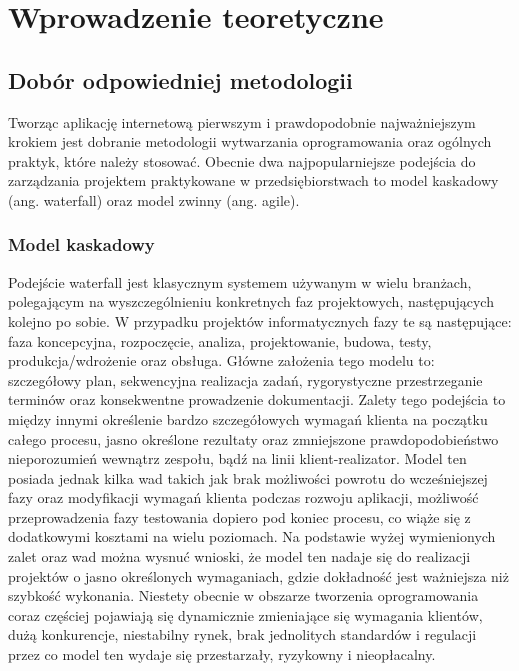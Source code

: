 \chapter{Wprowadzenie teoretyczne}
\label{cha:wprowadzenieTeoretyczne}

\section{Dobór odpowiedniej metodologii}
\label{sec:doborMetodologi}

Tworząc aplikację internetową pierwszym i prawdopodobnie najważniejszym krokiem
jest dobranie metodologii wytwarzania oprogramowania oraz ogólnych praktyk, które
należy stosować. Obecnie dwa najpopularniejsze podejścia do zarządzania projektem
praktykowane w przedsiębiorstwach to model kaskadowy (ang. waterfall) oraz model
zwinny (ang. agile).

\subsection{Model kaskadowy}
\label{subsec:modelKaskadowy}
Podejście waterfall jest klasycznym systemem używanym w wielu branżach,
polegającym na wyszczególnieniu konkretnych faz projektowych, następujących kolejno po sobie. W
przypadku projektów informatycznych fazy te są następujące: faza koncepcyjna, rozpoczęcie,
analiza, projektowanie, budowa, testy, produkcja/wdrożenie oraz obsługa. Główne
założenia tego modelu to: szczegółowy plan, sekwencyjna realizacja zadań, rygorystyczne
przestrzeganie terminów oraz konsekwentne prowadzenie dokumentacji. Zalety tego
podejścia to między innymi określenie bardzo szczegółowych wymagań klienta na początku
całego procesu, jasno określone rezultaty oraz zmniejszone prawdopodobieństwo
nieporozumień wewnątrz zespołu, bądź na linii klient-realizator. Model ten posiada jednak
kilka wad takich jak brak możliwości powrotu do wcześniejszej fazy oraz 
modyfikacji wymagań klienta podczas rozwoju aplikacji, możliwość przeprowadzenia
fazy testowania dopiero pod koniec procesu, co wiąże się z dodatkowymi kosztami na wielu
poziomach. Na podstawie wyżej wymienionych zalet oraz wad można wysnuć wnioski, że
model ten nadaje się do realizacji projektów o jasno określonych wymaganiach, gdzie
dokładność jest ważniejsza niż szybkość wykonania. Niestety obecnie w obszarze tworzenia
oprogramowania coraz częściej pojawiają się dynamicznie zmieniające się wymagania klientów, dużą konkurencje, niestabilny rynek, brak jednolitych standardów i regulacji przez
co model ten wydaje się przestarzały, ryzykowny i nieopłacalny.
